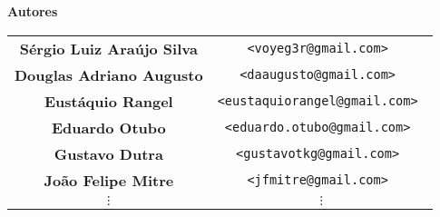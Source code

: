 \documentclass[10pt,a4paper,openany]{book}
\begin{document}
\newpage
\thispagestyle{empty}

\begin{center}
{\Huge \bf Autores}

\vspace{2cm}

\begin{tabular}{cc}
\bf Sérgio Luiz Araújo Silva 	& \tt <voyeg3r@gmail.com> 			\\
\bf Douglas Adriano Augusto 	& \tt <daaugusto@gmail.com>			\\
\bf Eustáquio Rangel 			& \tt <eustaquiorangel@gmail.com> 	\\
\bf Eduardo Otubo 				& \tt <eduardo.otubo@gmail.com> 	\\
\bf Gustavo Dutra 				& \tt <gustavotkg@gmail.com> 		\\
\bf João Felipe Mitre 			& \tt <jfmitre@gmail.com> 			\\
$\vdots$ 						& $\vdots$ 							\\
\end{tabular}

\end{center}

\newpage
\tableofcontents

\clearpage
\pagebreak
{}


















\fancyhf{} 
\fancyhead[LE,RO]{\bfseries\thepage}



% 

\clearpage
\fancyhf{} 


\fancyhf{} 
\fancyhead[LE,RO]{\bfseries\thepage}
\printindex
\end{document}
